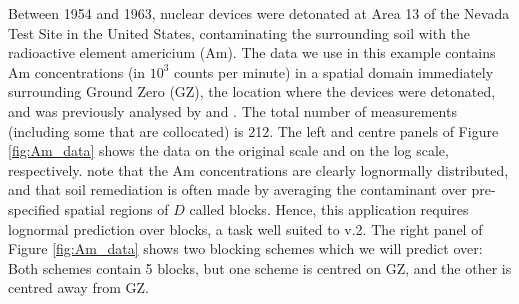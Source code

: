 \documentclass[nojss]{jss}
\begin{document}
Between 1954 and 1963, nuclear devices were detonated at Area 13 of the Nevada Test Site in the United States, contaminating the surrounding soil with the radioactive element americium (Am). 
The data we use in this example contains 
 Am concentrations (in $10^3$ counts per minute) in a spatial domain immediately surrounding Ground Zero (GZ), the location where the devices were detonated, and was previously analysed by \cite{Huang_2009_multivar_intrinsic_rand_functions_cokriging} and \cite{Paul_Cressie_2011_lognormal_kriging_block_prediction}. 
The total number of measurements (including some that are collocated) is 212.
The left and centre panels of Figure \ref{fig:Am_data} shows the data on the original scale and on the log scale, respectively.
\cite{Paul_Cressie_2011_lognormal_kriging_block_prediction} note that the Am concentrations are clearly lognormally distributed, and that soil remediation is often made by averaging the contaminant over pre-specified spatial regions of $D$ called blocks.
Hence, %
 this application requires lognormal prediction over blocks, a task well suited to  v.2. %
 The right panel of Figure \ref{fig:Am_data} shows two blocking schemes which we will predict over: Both schemes contain 5 blocks, but one scheme is centred on GZ, and the other is centred away from GZ.
\end{document}

